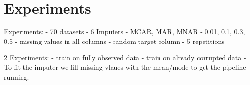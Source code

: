 
\section{Experiments}
%

Experiments:
- 70 datasets
- 6 Imputers
- MCAR, MAR, MNAR
- 0.01, 0.1, 0.3, 0.5
- missing values in all columns
- random target column
- 5 repetitions

2 Experiments:
- train on fully observed data
- train on already corrupted data
	- To fit the imputer we fill missing vlaues with the mean/mode to get the pipeline running.
